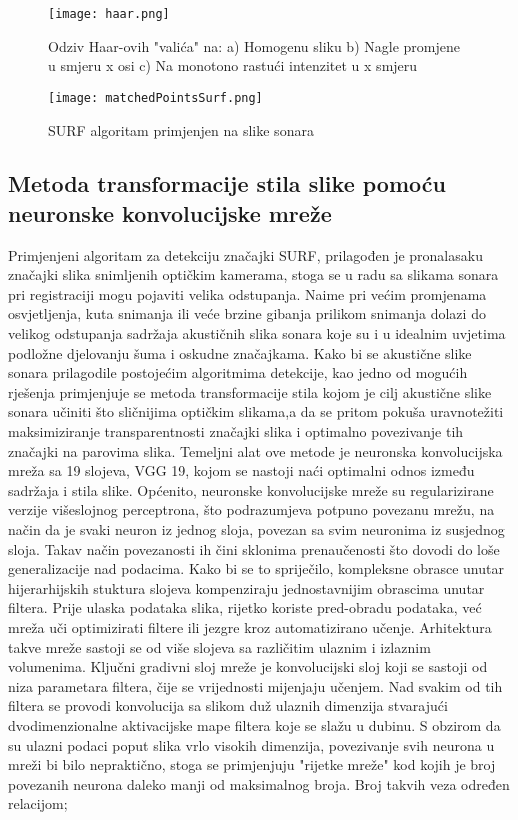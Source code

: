 \documentclass[times, utf8, diplomski]{fer}
\begin{document}
\begin{figure}
\texttt{[image: haar.png]}
		\caption{Odziv Haar-ovih "valića" na: a) Homogenu sliku b) Nagle promjene u smjeru x osi c) Na monotono rastući intenzitet u x smjeru }
		\label{fig:Uspješna registracija dviju akustičnih slika FLS-a}
\end{figure}
\begin{figure}
\texttt{[image: matchedPointsSurf.png]}
		\caption{SURF algoritam primjenjen na slike sonara }
		\label{fig:Uspješna registracija dviju akustičnih slika FLS-a}
\end{figure}
\subsection{Metoda transformacije stila slike pomoću neuronske konvolucijske mreže}
Primjenjeni algoritam za detekciju značajki SURF, prilagođen je pronalasaku značajki slika snimljenih optičkim kamerama, stoga se u radu sa slikama sonara pri registraciji mogu pojaviti velika odstupanja. Naime pri većim promjenama osvjetljenja, kuta snimanja ili veće brzine gibanja prilikom snimanja dolazi do velikog odstupanja sadržaja akustičnih slika sonara koje su i u idealnim uvjetima podložne djelovanju šuma i oskudne značajkama. Kako bi se akustične slike sonara prilagodile postojećim algoritmima detekcije, kao jedno od mogućih rješenja primjenjuje se metoda transformacije stila kojom je cilj akustične slike sonara učiniti što sličnijima optičkim slikama,a da se pritom pokuša uravnotežiti maksimiziranje transparentnosti značajki slika i optimalno povezivanje tih značajki na parovima slika. Temeljni alat ove metode je neuronska konvolucijska mreža sa 19 slojeva, VGG 19, kojom se nastoji naći optimalni odnos između sadržaja i stila slike. Općenito, neuronske konvolucijske mreže su regularizirane verzije višeslojnog perceptrona, što podrazumjeva potpuno povezanu mrežu, na način da je svaki neuron iz jednog sloja, povezan sa svim neuronima iz susjednog sloja. Takav način povezanosti ih čini sklonima prenaučenosti što dovodi do loše generalizacije nad podacima. Kako bi se to spriječilo, kompleksne obrasce unutar hijerarhijskih stuktura slojeva kompenziraju jednostavnijim obrascima unutar filtera. Prije ulaska podataka slika, rijetko koriste pred-obradu podataka, već mreža uči optimizirati filtere ili jezgre kroz automatizirano učenje. Arhitektura takve mreže sastoji se od više slojeva sa različitim ulaznim i izlaznim volumenima. Ključni gradivni sloj mreže je konvolucijski sloj koji se sastoji od niza parametara filtera, čije se vrijednosti mijenjaju učenjem. Nad svakim od tih filtera se provodi konvolucija sa slikom duž ulaznih dimenzija stvarajući dvodimenzionalne aktivacijske mape filtera koje se slažu u dubinu. S obzirom da su ulazni podaci poput slika vrlo visokih dimenzija, povezivanje svih neurona u mreži bi bilo nepraktično, stoga se primjenjuju "rijetke mreže" kod kojih je broj povezanih neurona daleko manji od maksimalnog broja. Broj takvih veza određen relacijom;
\end{document}
